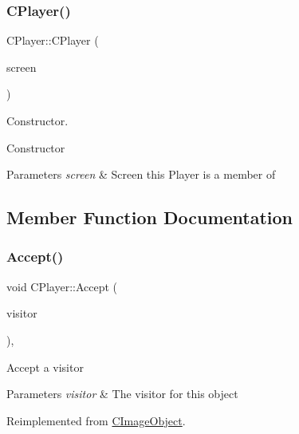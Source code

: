 \subsubsection{\texorpdfstring{CPlayer()}{CPlayer()}}
{\footnotesize\ttfamily C\+Player\+::\+C\+Player (\begin{DoxyParamCaption}\item[{\mbox{\hyperlink{class_c_screen}{C\+Screen}} $\ast$}]{screen }\end{DoxyParamCaption})}



Constructor. 

Constructor 
\begin{DoxyParams}{Parameters}
{\em screen} & Screen this Player is a member of \\
\hline
\end{DoxyParams}


\subsection{Member Function Documentation}
\mbox{\label{class_c_player_a524a0fd1d55d4ac0a55d00d0492018f8}} 
\subsubsection{\texorpdfstring{Accept()}{Accept()}}
{\footnotesize\ttfamily void C\+Player\+::\+Accept (\begin{DoxyParamCaption}\item[{\mbox{\hyperlink{class_c_visitor}{C\+Visitor}} $\ast$}]{visitor }\end{DoxyParamCaption})\hspace{0.3cm}{\ttfamily [inline]}, {\ttfamily [virtual]}}

Accept a visitor 
\begin{DoxyParams}{Parameters}
{\em visitor} & The visitor for this object \\
\hline
\end{DoxyParams}


Reimplemented from \mbox{\hyperlink{class_c_image_object_a7130a9fa130c2028aba6c28dcfc876d5}{C\+Image\+Object}}.

\mbox{\label{class_c_player_aeb60d84df335907e5d0657dbfe314982}} 
